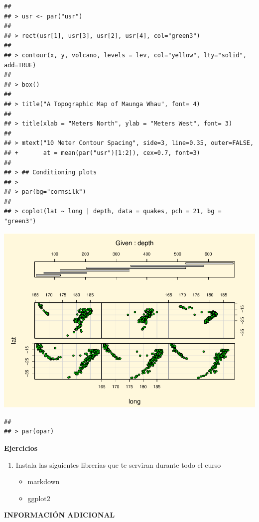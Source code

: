 \documentclass[
]{book}
\providecommand{\tightlist}{%
  \setlength{\itemsep}{0pt}\setlength{\parskip}{0pt}}
\begin{document}
\begin{verbatim}
## 
## > usr <- par("usr")
## 
## > rect(usr[1], usr[3], usr[2], usr[4], col="green3")
## 
## > contour(x, y, volcano, levels = lev, col="yellow", lty="solid", add=TRUE)
## 
## > box()
## 
## > title("A Topographic Map of Maunga Whau", font= 4)
## 
## > title(xlab = "Meters North", ylab = "Meters West", font= 3)
## 
## > mtext("10 Meter Contour Spacing", side=3, line=0.35, outer=FALSE,
## +       at = mean(par("usr")[1:2]), cex=0.7, font=3)
## 
## > ## Conditioning plots
## > 
## > par(bg="cornsilk")
## 
## > coplot(lat ~ long | depth, data = quakes, pch = 21, bg = "green3")
\end{verbatim}

\includegraphics{bookdown-demo_files/figure-latex/unnamed-chunk-5-11.pdf}

\begin{verbatim}
## 
## > par(opar)
\end{verbatim}

\textbf{Ejercicios}

\begin{enumerate}
\def\labelenumi{\arabic{enumi}.}
\tightlist
\item
  Instala las siguientes librerías que te serviran durante todo el curso

  \begin{itemize}
  \tightlist
  \item
    markdown
  \item
    ggplot2
  \end{itemize}
\end{enumerate}

\textbf{INFORMACIÓN ADICIONAL}
\end{document}
